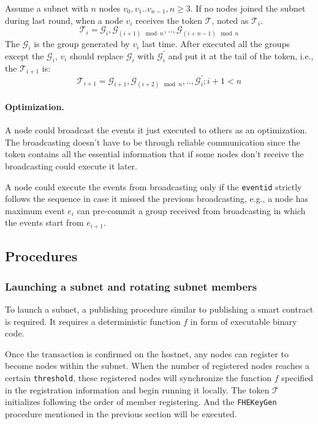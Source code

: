 \documentclass[11pt]{article}
\begin{document}
Assume a subnet with $n$ nodes \( v_{0}, v_{1} .. v_{n-1}, n\geq 3\). If no nodes joined the subnet during last round, when a node $v_{i}$ receives the token $\mathcal{T}$, noted as $\mathcal{T}_{i}$.
\begin{equation}
\mathcal{T}_{i} = \mathcal{G}_{i}, \mathcal{G}_{(i + 1)\mod n},.., \mathcal{G}_{(i + n - 1)\mod n}
\end{equation}
The $\mathcal{G}_{i}$ is the group generated by $v_{i}$ last time. After executed all the groups except the $\mathcal{G}_{i}$, $v_{i}$ should replace $\mathcal{G}_{i}$ with $\mathcal{G}_{i}^{\prime}$ and put it at the tail of the token, i.e., the $\mathcal{T}_{i+1}$ is:
\begin{equation}
\mathcal{T}_{i+1} = \mathcal{G}_{i+1}, \mathcal{G}_{(i+2)\mod n},.., \mathcal{G}_{i}^{\prime}; i+1<n
\end{equation}

\paragraph{Optimization.} A node could broadcast the events it just executed to others as an optimization.
The broadcasting doesn{'}t have to be through reliable communication since the token contains all the essential information that if some nodes don{'}t receive the broadcasting could execute it later.

A node could execute the events from broadcasting only if the \texttt{eventid} strictly follows the sequence in case it missed the previous broadcasting, e.g., a node has maximum event $e_{i}$ can pre-commit a group received from broadcasting in which the events start from $e_{i+1}$.


\subsection{Procedures}
\subsubsection{Launching a subnet and rotating subnet members}
\label{sec:launch_subnet_and_rotate}
To launch a subnet, a publishing procedure similar to publishing a smart contract is required.
It requires a deterministic function $f$ in form of executable binary code.

Once the transaction is confirmed on the hostnet, any nodes can register to become nodes within the subnet.
When the number of registered nodes reaches a certain \texttt{threshold}, these registered nodes will synchronize the function $f$ specified in the registration information and begin running it locally.
The token $\mathcal{T}$ initializes following the order of member registering.
And the \texttt{FHEKeyGen} procedure mentioned in the previous section will be executed.
\end{document}
